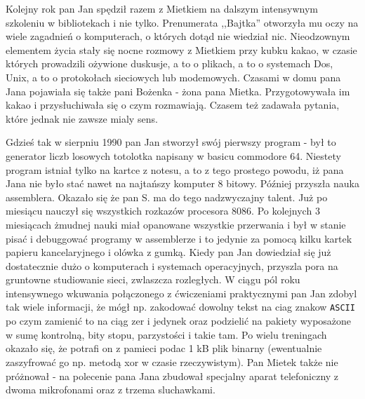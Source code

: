 \documentclass[a4paper,polish,titlepage,12pt]{article}
\begin{document}
Kolejny rok pan Jan spędził razem z Mietkiem na dalszym intensywnym szkoleniu w bibliotekach i nie tylko. Prenumerata ,,Bajtka'' otworzyła mu oczy na wiele zagadnień o 
komputerach, o których dotąd nie wiedział nic. Nieodzownym elementem życia stały się nocne rozmowy z Mietkiem przy kubku kakao, w czasie których prowadzili ożywione duskusje, 
a to o plikach, a to o systemach Dos, Unix, a to o protokołach sieciowych lub modemowych. Czasami w domu pana Jana pojawiała się także pani Bożenka - żona pana Mietka. 
Przygotowywała im kakao i przysłuchiwała się o czym rozmawiają. Czasem też zadawała pytania, które jednak nie zawsze mialy sens.

Gdzieś tak w sierpniu 1990 pan Jan stworzył swój pierwszy program - był to generator liczb losowych totolotka napisany w basicu commodore 64. Niestety program istniał tylko 
na kartce z notesu, a to z tego prostego powodu, iż pana Jana nie było stać nawet na najtańszy komputer 8 bitowy. Później przyszła nauka assemblera. Okazało się że pan S. ma 
do tego nadzwyczajny talent. Już po miesiącu nauczył się wszystkich rozkazów procesora 8086. Po kolejnych 3 miesiącach żmudnej nauki miał opanowane wszystkie przerwania i był 
w stanie pisać i debuggować programy w assemblerze i to jedynie za pomocą kilku kartek papieru kancelaryjnego i olówka z gumką. Kiedy pan Jan dowiedział się już dostatecznie 
dużo o komputerach i systemach operacyjnych, przyszla pora na gruntowne studiowanie sieci, zwlaszcza rozległych. W ciągu pól roku intensywnego wkuwania połączonego z 
ćwiczeniami praktycznymi pan Jan zdobyl tak wiele informacji, że mógł np. zakodować dowolny tekst na ciag znakow \verb+ASCII+ po czym zamienić to na ciąg zer i jedynek oraz 
podzielić na pakiety wyposażone w sumę kontrolną, bity stopu, parzystości i takie tam. Po wielu treningach okazało się, że potrafi on z pamieci podac 1 kB plik binarny 
(ewentualnie zaszyfrować go np. metodą xor w czasie rzeczywistym). Pan Mietek także nie próżnował - na polecenie pana Jana zbudował specjalny aparat telefoniczny z dwoma 
mikrofonami oraz z trzema sluchawkami.
\end{document}
